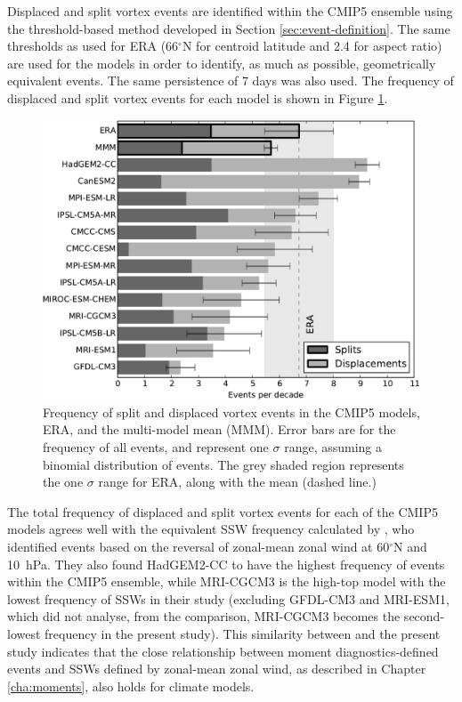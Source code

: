 Displaced and split vortex events are identified within the CMIP5 ensemble using
the threshold-based method developed in Section \ref{sec:event-definition}. The
same thresholds as used for ERA (66$^{\circ}$N for centroid latitude and 2.4 for
aspect ratio) are used for the models in order to identify, as much as possible,
geometrically equivalent events. The same persistence of 7 days was also used.
The frequency of displaced and split vortex events for each model is shown in
Figure \ref{fig:cmip5_events_bar_stacked}.

\begin{figure}
 \centering
 \noindent\includegraphics[width=\textwidth]{figures/chapter-models/events_bar_stacked.pdf}
 \caption[Frequency of split and displaced vortex events in the CMIP5
 models]{Frequency of split and displaced vortex events in the CMIP5 models,
   ERA, and the multi-model mean (MMM). Error bars are for the frequency of all
   events, and represent one $\sigma$ range, assuming a binomial distribution of
   events. The grey shaded region represents the one $\sigma$ range for ERA,
   along with the mean (dashed line.) }
 \label{fig:cmip5_events_bar_stacked}
\end{figure}

The total frequency of displaced and split vortex events for each of the CMIP5
models agrees well with the equivalent SSW frequency calculated by
\citet{Charlton-Perez2013}, who identified events based on the reversal of
zonal-mean zonal wind at 60$^{\circ}$N and 10~hPa. They also found HadGEM2-CC to
have the highest frequency of events within the CMIP5 ensemble, while MRI-CGCM3
is the high-top model with the lowest frequency of SSWs in their study
(excluding GFDL-CM3 and MRI-ESM1, which \citet{Charlton-Perez2013} did not
analyse, from the comparison, MRI-CGCM3 becomes the second-lowest frequency in
the present study). This similarity between \citet{Charlton-Perez2013} and the
present study indicates that the close relationship between moment
diagnostics-defined events and SSWs defined by zonal-mean zonal wind, as
described in Chapter \ref{cha:moments}, also holds for climate models.

